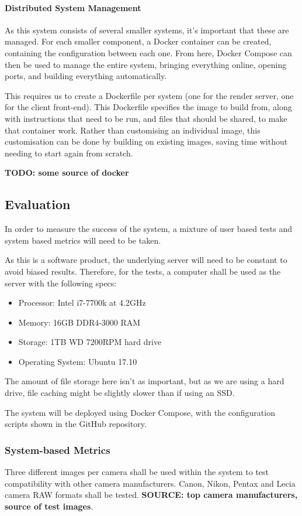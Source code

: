 \documentclass[12pt,a4paper]{article}
\begin{document}
\paragraph{Distributed System Management}
As this system consists of several smaller systems, it's important that these are
managed. For each smaller component, a Docker container can be created, containing the
configuration between each one. From here, Docker Compose can then be used to manage
the entire system, bringing everything online, opening ports, and building everything
automatically.

This requires us to create a Dockerfile per system (one for the render server,
one for the client front-end). This Dockerfile specifies the image to build from,
along with instructions that need to be run, and files that should be shared, to make
that container work. Rather than customising an individual image, this customisation can be done
by building on existing images, saving time without needing to start again from scratch. \cite{DockerWhyItsUseful}

\textbf{TODO: some source of docker}
\subsection{Evaluation}
In order to measure the success of the system, a mixture of user based tests and system
based metrics will need to be taken.

As this is a software product, the underlying server will need to be constant to avoid
biased results. Therefore, for the tests, a computer shall be used as the server with the
following specs:

\begin{itemize}
  \item Processor: Intel i7-7700k at 4.2GHz
  \item Memory: 16GB DDR4-3000 RAM
  \item Storage: 1TB WD 7200RPM hard drive
  \item Operating System: Ubuntu 17.10
\end{itemize}

The amount of file storage here isn't as important, but as we are using a hard drive,
file caching might be slightly slower than if using an SSD.

The system will be deployed using Docker Compose, with the configuration scripts shown in the GitHub
repository.

\subsubsection{System-based Metrics}
Three different images per camera shall be used within the system to test compatibility
with other camera manufacturers. Canon, Nikon, Pentax and Lecia camera RAW formats shall be tested.
\textbf{SOURCE: top camera manufacturers, source of test images}.
\end{document}

